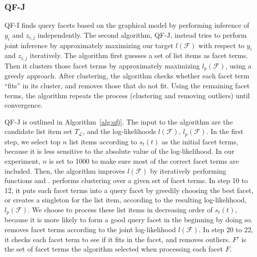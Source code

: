 \subsubsection{QF-J}
QF-I finds query facets based on the graphical model by performing inference of $y_i$ and $z_{i,j}$ independently.
The second algorithm, QF-J, instead tries to perform joint inference by approximately maximizing our target $l(\mathcal{F})$ with respect to  $y_i$ and $z_{i,j}$ iteratively.
The algorithm first guesses a set of list items as facet terms.
Then it clusters those facet terms by approximately maximizing $l_p(\mathcal{F})$, using a greedy approach. 
After clustering, the algorithm checks whether each facet term ``fits'' in its cluster, and removes those that do not fit.
Using the remaining facet terms, the algorithm repeats the process (clustering and removing outliers) until convergence.

QF-J is outlined in Algorithm~\ref{alg:qfj}. The input to the algorithm are the candidate list item set $T_{\mathcal{L}}$,
and the log-likelihoods $l(\mathcal{F})$, $l_p(\mathcal{F})$.
In the first step, we select top $n$ list items according to $s_t(t)$ as the initial facet terms, because it is less sensitive to the absolute value of the log-likelihood.
In our experiment, $n$ is set to 1000 to make sure most of the correct facet terms are included.
Then, the algorithm improves $l(\mathcal{F})$ by iteratively performing functions  and .
 performs clustering over a given set of facet terms.
In step 10 to 12, it puts each facet terms into a query facet by greedily choosing the best facet, or creates a singleton for the list item, according to the resulting log-likelihood, $l_p(\mathcal{F})$.
We choose to process these list items in decreasing order of $s_t(t)$, because it is more likely to form a good query facet in the beginning by doing so.
 removes facet terms according to the joint log-likelihood $l(\mathcal{F})$.
In step 20 to 22, it checks each facet term to see if it fits in the facet, and removes outliers.
$F'$ is the set of facet terms the algorithm selected when processing each facet $F$.


